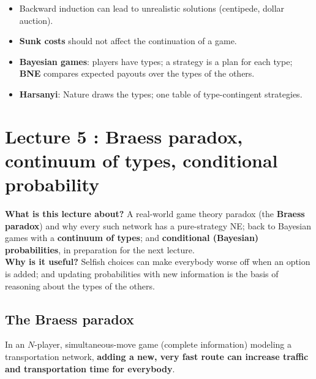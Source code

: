 \documentclass[11pt,a4paper,openany]{book}
\begin{document}
\begin{keybox}[title=Summary]
\begin{itemize}
  \item Backward induction can lead to unrealistic solutions (centipede, dollar auction).
  \item \textbf{Sunk costs} should not affect the continuation of a game.
  \item \textbf{Bayesian games}: players have types; a strategy is a plan for each type;
        \textbf{BNE} compares expected payouts over the types of the others.
  \item \textbf{Harsanyi}: Nature draws the types; one table of type-contingent strategies.
\end{itemize}
\end{keybox}


\chapter{Lecture 5 : Braess paradox, continuum of types, conditional probability}

\begin{rembox}[title=In a nutshell]
\textbf{What is this lecture about?} A real-world game theory paradox (the \textbf{Braess
paradox}) and why every such network has a pure-strategy NE; back to Bayesian games with a
\textbf{continuum of types}; and \textbf{conditional (Bayesian) probabilities}, in
preparation for the next lecture. \\
\textbf{Why is it useful?} Selfish choices can make everybody worse off when an option is
added; and updating probabilities with new information is the basis of reasoning about the
types of the others.
\end{rembox}

\section{The Braess paradox}

\begin{defnbox}[title=Braess paradox]
In an $N$-player, simultaneous-move game (complete information) modeling a transportation
network, \textbf{adding a new, very fast route can increase traffic and transportation time
for everybody}.
\end{defnbox}
\end{document}
